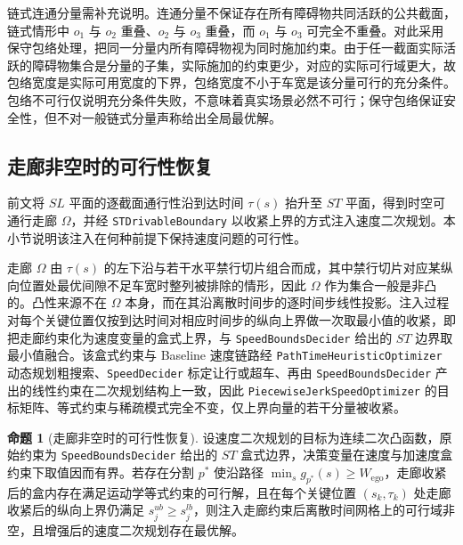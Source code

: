 \documentclass[a4paper,11pt]{ctexart}
\theoremstyle{definition}
\newtheorem{proposition}{命题}[section]
\begin{document}
链式连通分量需补充说明。连通分量不保证存在所有障碍物共同活跃的公共截面，链式情形中 $o_1$ 与 $o_2$ 重叠、$o_2$ 与 $o_3$ 重叠，而 $o_1$ 与 $o_3$ 可完全不重叠。对此采用保守包络处理，把同一分量内所有障碍物视为同时施加约束。由于任一截面实际活跃的障碍物集合是分量的子集，实际施加的约束更少，对应的实际可行域更大，故包络宽度是实际可用宽度的下界，包络宽度不小于车宽是该分量可行的充分条件。包络不可行仅说明充分条件失败，不意味着真实场景必然不可行；保守包络保证安全性，但不对一般链式分量声称给出全局最优解。

\subsection{走廊非空时的可行性恢复}
\label{sec:thy_feasibility}

前文将 $SL$ 平面的逐截面通行性沿到达时间 $\tau(s)$ 抬升至 $ST$ 平面，得到时空可通行走廊 $\Omega$，并经 \texttt{STDrivableBoundary} 以收紧上界的方式注入速度二次规划。本小节说明该注入在何种前提下保持速度问题的可行性。

走廊 $\Omega$ 由 $\tau(s)$ 的左下沿与若干水平禁行切片组合而成，其中禁行切片对应某纵向位置处最优间隙不足车宽时整列被排除的情形，因此 $\Omega$ 作为集合一般是非凸的。凸性来源不在 $\Omega$ 本身，而在其沿离散时间步的逐时间步线性投影。注入过程对每个关键位置仅按到达时间对相应时间步的纵向上界做一次取最小值的收紧，即把走廊约束化为速度变量的盒式上界，与 \texttt{SpeedBoundsDecider} 给出的 $ST$ 边界取最小值融合。该盒式约束与 Baseline 速度链路经 \texttt{PathTimeHeuristicOptimizer} 动态规划粗搜索、\texttt{SpeedDecider} 标定让行或超车、再由 \texttt{SpeedBoundsDecider} 产出的线性约束在二次规划结构上一致，因此 \texttt{PiecewiseJerkSpeedOptimizer} 的目标矩阵、等式约束与稀疏模式完全不变，仅上界向量的若干分量被收紧。

\begin{proposition}[走廊非空时的可行性恢复]
\label{prop:feasibility_recovery}
设速度二次规划的目标为连续二次凸函数，原始约束为 \texttt{SpeedBoundsDecider} 给出的 $ST$ 盒式边界，决策变量在速度与加速度盒约束下取值因而有界。若存在分割 $p^{*}$ 使沿路径 $\min_s g_{p^{*}}(s) \geq W_{\text{ego}}$，走廊收紧后的盒内存在满足运动学等式约束的可行解，且在每个关键位置 $(s_k, \tau_k)$ 处走廊收紧后的纵向上界仍满足 $s_j^{ub} \geq s_j^{lb}$，则注入走廊约束后离散时间网格上的可行域非空，且增强后的速度二次规划存在最优解。
\end{proposition}
\end{document}
